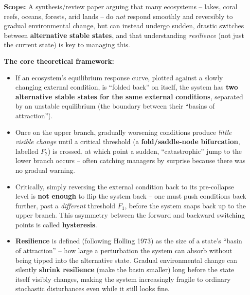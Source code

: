 \documentclass[11pt,a4paper]{article}
\begin{document}
\begin{papbox}[title={Paper Summary: Scheffer, Carpenter, Foley, Folke \& Walker (2001), \textit{Nature} 413:591--596 -- ``Catastrophic Shifts in Ecosystems''}]
\textbf{Scope:} A synthesis/review paper arguing that many ecosystems -- lakes, coral reefs, oceans, forests, arid lands -- do \emph{not} respond smoothly and reversibly to gradual environmental change, but can instead undergo sudden, drastic switches between \textbf{alternative stable states}, and that understanding \emph{resilience} (not just the current state) is key to managing this.

\textbf{The core theoretical framework:}
\begin{itemize}[leftmargin=1.3em,nosep]
\item If an ecosystem's equilibrium response curve, plotted against a slowly changing external condition, is ``folded back'' on itself, the system has \textbf{two alternative stable states for the same external conditions}, separated by an unstable equilibrium (the boundary between their ``basins of attraction'').
\item Once on the upper branch, gradually worsening conditions produce \emph{little visible change} until a critical threshold (a \textbf{fold/saddle-node bifurcation}, labelled $F_2$) is crossed, at which point a sudden, ``catastrophic'' jump to the lower branch occurs -- often catching managers by surprise because there was no gradual warning.
\item Critically, simply reversing the external condition back to its pre-collapse level is \textbf{not enough} to flip the system back -- one must push conditions back further, past a \emph{different} threshold $F_1$, before the system snaps back up to the upper branch. This asymmetry between the forward and backward switching points is called \textbf{hysteresis}.
\item \textbf{Resilience} is defined (following Holling 1973) as the size of a state's ``basin of attraction'' -- how large a perturbation the system can absorb without being tipped into the alternative state. Gradual environmental change can silently \textbf{shrink resilience} (make the basin smaller) long before the state itself visibly changes, making the system increasingly fragile to ordinary stochastic disturbances even while it still looks fine.
\end{itemize}


\end{papbox}
\end{document}
